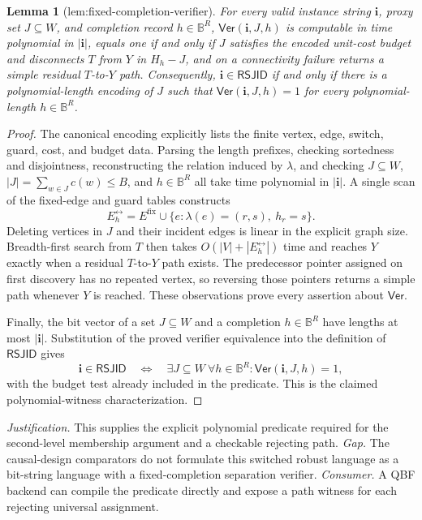 \documentclass{article}
\newtheorem{lemma}{Lemma}
\begin{document}
\begin{lemma}[lem:fixed-completion-verifier]\label{lem:fixed-completion-verifier}
For every valid instance string \(\mathbf i\), proxy set \(J\subseteq W\), and completion record \(h\in\mathbb B^R\), \(\mathsf{Ver}(\mathbf i,J,h)\) is computable in time polynomial in \(|\mathbf i|\), equals one if and only if \(J\) satisfies the encoded unit-cost budget and disconnects \(T\) from \(Y\) in \(H_h-J\), and on a connectivity failure returns a simple residual \(T\)-to-\(Y\) path. Consequently, \(\mathbf i\in\mathsf{RSJID}\) if and only if there is a polynomial-length encoding of \(J\) such that \(\mathsf{Ver}(\mathbf i,J,h)=1\) for every polynomial-length \(h\in\mathbb B^R\).
\end{lemma}
\begin{proof}
The canonical encoding explicitly lists the finite vertex, edge, switch, guard, cost, and budget data.  Parsing the length prefixes, checking sortedness and disjointness, reconstructing the relation induced by \(\lambda\), and checking \(J\subseteq W\), \(|J|=\sum_{w\in J}c(w)\le B\), and \(h\in\mathbb B^R\) all take time polynomial in \(|\mathbf i|\).  A single scan of the fixed-edge and guard tables constructs
\[
 E_h^{\leftrightarrow}=E^{\mathrm{fix}}\cup
 \{e:\lambda(e)=(r,s),\ h_r=s\}.
\]
Deleting vertices in \(J\) and their incident edges is linear in the explicit graph size.  Breadth-first search from \(T\) then takes \(O(|V|+|E_h^{\leftrightarrow}|)\) time and reaches \(Y\) exactly when a residual \(T\)-to-\(Y\) path exists.  The predecessor pointer assigned on first discovery has no repeated vertex, so reversing those pointers returns a simple path whenever \(Y\) is reached.  These observations prove every assertion about \(\mathsf{Ver}\).

Finally, the bit vector of a set \(J\subseteq W\) and a completion \(h\in\mathbb B^R\) have lengths at most \(|\mathbf i|\).  Substitution of the proved verifier equivalence into the definition of \(\mathsf{RSJID}\) gives
\[
 \mathbf i\in\mathsf{RSJID}
 \quad\Longleftrightarrow\quad
 \exists J\subseteq W\ \forall h\in\mathbb B^R:
 \mathsf{Ver}(\mathbf i,J,h)=1,
\]
with the budget test already included in the predicate.  This is the claimed polynomial-witness characterization.
\end{proof}
\par\smallskip\noindent \textit{Justification.} This supplies the explicit polynomial predicate required for the second-level membership argument and a checkable rejecting path. \textit{Gap.} The causal-design comparators do not formulate this switched robust language as a bit-string language with a fixed-completion separation verifier. \textit{Consumer.} A QBF backend can compile the predicate directly and expose a path witness for each rejecting universal assignment.
\end{document}
